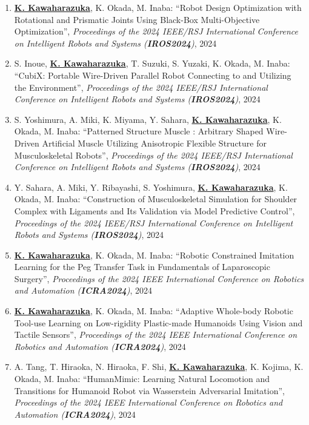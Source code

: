 \documentclass[letterpaper]{article}
\begin{document}
\begin{enumerate}
\item \underline{\textbf{K. Kawaharazuka}}, K. Okada, M. Inaba: ``Robot Design Optimization with Rotational and Prismatic Joints Using Black-Box Multi-Objective Optimization'', \textit{Proceedings of the 2024 IEEE/RSJ International Conference on Intelligent Robots and Systems (\textit{\textbf{IROS2024}})}, 2024
\item S. Inoue, \underline{\textbf{K. Kawaharazuka}}, T. Suzuki, S. Yuzaki, K. Okada, M. Inaba: ``CubiX: Portable Wire-Driven Parallel Robot Connecting to and Utilizing the Environment'', \textit{Proceedings of the 2024 IEEE/RSJ International Conference on Intelligent Robots and Systems (\textit{\textbf{IROS2024}})}, 2024
\item S. Yoshimura, A. Miki, K. Miyama, Y. Sahara, \underline{\textbf{K. Kawaharazuka}}, K. Okada, M. Inaba: ``Patterned Structure Muscle : Arbitrary Shaped Wire-Driven Artificial Muscle Utilizing Anisotropic Flexible Structure for Musculoskeletal Robots'', \textit{Proceedings of the 2024 IEEE/RSJ International Conference on Intelligent Robots and Systems (\textit{\textbf{IROS2024}})}, 2024
\item Y. Sahara, A. Miki, Y. Ribayashi, S. Yoshimura, \underline{\textbf{K. Kawaharazuka}}, K. Okada, M. Inaba: ``Construction of Musculoskeletal Simulation for Shoulder Complex with Ligaments and Its Validation via Model Predictive Control'', \textit{Proceedings of the 2024 IEEE/RSJ International Conference on Intelligent Robots and Systems (\textit{\textbf{IROS2024}})}, 2024
\item \underline{\textbf{K. Kawaharazuka}}, K. Okada, M. Inaba: ``Robotic Constrained Imitation Learning for the Peg Transfer Task in Fundamentals of Laparoscopic Surgery'', \textit{Proceedings of the 2024 IEEE International Conference on Robotics and Automation (\textit{\textbf{ICRA2024}})}, 2024
\item \underline{\textbf{K. Kawaharazuka}}, K. Okada, M. Inaba: ``Adaptive Whole-body Robotic Tool-use Learning on Low-rigidity Plastic-made Humanoids Using Vision and Tactile Sensors'', \textit{Proceedings of the 2024 IEEE International Conference on Robotics and Automation (\textit{\textbf{ICRA2024}})}, 2024
\item A. Tang, T. Hiraoka, N. Hiraoka, F. Shi, \underline{\textbf{K. Kawaharazuka}}, K. Kojima, K. Okada, M. Inaba: ``HumanMimic: Learning Natural Locomotion and Transitions for Humanoid Robot via Wasserstein Adversarial Imitation'', \textit{Proceedings of the 2024 IEEE International Conference on Robotics and Automation (\textit{\textbf{ICRA2024}})}, 2024

\end{enumerate}
\end{document}
